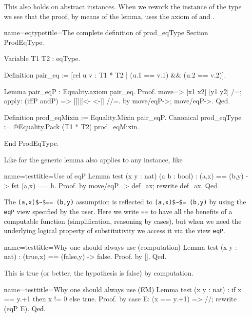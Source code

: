 This also holds on
abstract instances.
When we rework the instance of the type  we see that the
proof, by means of the  lemma, uses the axiom of  and
.

\begin{coq}{name=eqtype}{title=The complete definition of prod\_eqType}
Section ProdEqType.

Variable T1 T2 : eqType.

Definition pair_eq := [rel u v : T1 * T2 | (u.1 == v.1) && (u.2 == v.2)].

Lemma pair_eqP : Equality.axiom pair_eq.
Proof.
move=> [x1 x2] [y1 y2] /=; apply: (iffP andP) => [[]|[<- <-]] //=.
by move/eqP->; move/eqP->.
Qed.

Definition prod_eqMixin := Equality.Mixin pair_eqP.
Canonical prod_eqType := @Equality.Pack (T1 * T2) prod_eqMixin.

End ProdEqType.
\end{coq}

Like for  the generic lemma  also applies to
any  instance, like 

\begin{coq}{name=test}{title=Use of eqP}
Lemma test (x y : nat) (a b : bool) : (a,x) == (b,y) -> fst (a,x) == b.
Proof. by move/eqP=> def_ax; rewrite def_ax. Qed.
\end{coq}

The \lstinline/(a,x)$~$== (b,y)/ assumption is reflected to
\lstinline/(a,x)$~$= (b,y)/ by using the \lstinline/eqP/ view
specified by the user.  Here we write \lstinline/==/ to have
all the benefits of a computable function (simplification, reasoning
by cases), but when we need the underlying logical property of
substitutivity we access it via the view \lstinline/eqP/.

\begin{coq}{name=test}{title=Why one should always use \C{==}
	(computation)}
Lemma test (x y : nat) : (true,x) == (false,y) -> false.
Proof. by []. Qed.
\end{coq}

This is true (or better, the hypothesis is false) by computation.

\begin{coq}{name=test}{title=Why one should always use \C{==} (EM)}
Lemma test (x y : nat) : if x == y.+1 then x != 0 else true.
Proof. by case E: (x == y.+1) => //; rewrite (eqP E). Qed.
\end{coq}


